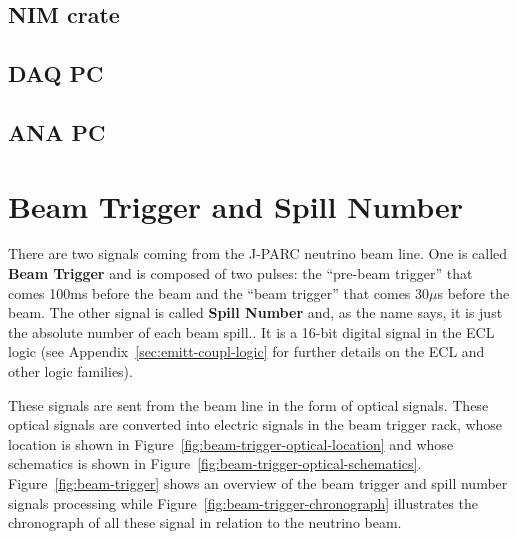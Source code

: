 \subsection{NIM crate}

\subsection{DAQ PC}

\subsection{ANA PC}

\section{Beam Trigger and Spill Number}\label{sec:beam-trigger-spill}
There are two signals coming from the J-PARC neutrino beam line. One is called
\textbf{Beam Trigger} and is composed of two
pulses: the ``pre-beam trigger'' that comes 100ms before the beam and the ``beam
trigger'' that comes 30$\mu$s before the beam. The other signal is called \textbf{Spill
Number} and, as the name says, it is just the absolute number of each beam
spill.. It is a 16-bit digital signal in the ECL logic (see
Appendix~\ref{sec:emitt-coupl-logic} for further details on the ECL and other
logic families).

These signals are sent from the beam line in the form of optical
signals. These optical signals are converted into electric signals in the beam
trigger rack, whose location is shown in
Figure~\ref{fig:beam-trigger-optical-location} and whose schematics is shown in
Figure~\ref{fig:beam-trigger-optical-schematics}. Figure~\ref{fig:beam-trigger}
shows an overview of the beam trigger and spill number signals processing while
Figure~\ref{fig:beam-trigger-chronograph} illustrates the chronograph of all
these signal in relation to the neutrino beam.

